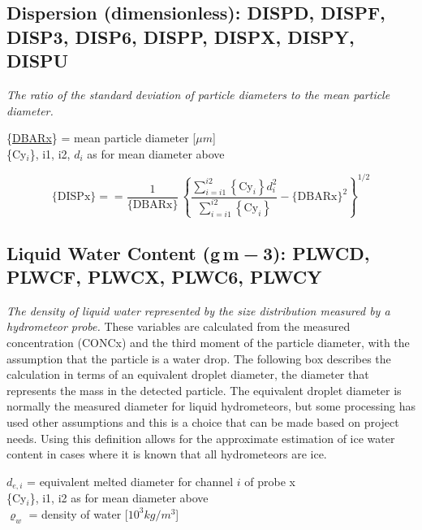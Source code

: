 \documentclass[
]{book}
\begin{document}
\hypertarget{dispersion}{%
\subsection*{Dispersion (dimensionless): DISPD, DISPF, DISP3, DISP6, DISPP, DISPX, DISPY, DISPU}\label{dispersion}}

\emph{The ratio of the standard deviation of particle diameters to the mean particle diameter.}

\{\protect\hyperlink{mean-diameter}{DBARx}\} = mean particle diameter {[}\(\mu m\){]}\\
\{Cy\(_{i}\)\}, i1, i2, \(d_{i}\) as for mean diameter above

\begin{equation}
\mathrm{\{DISPx\}}==\frac{1}{\{\mathrm{DBARx}\}}\,\left\{ \frac{{\textstyle \sum_{i=i1}^{i2}}{\displaystyle {\displaystyle \left\{ \mathrm{Cy}_{i}\right\} d_{i}^{2}}}}{\sum_{i=i1}^{i2}\left\{ \mathrm{Cy}_{i}\right\} }-\{\mathrm{DBARx}\}^{2}\right\} ^{1/2}
\label{eq:DISPbox}
\end{equation}

\hypertarget{PSD-LWC}{%
\subsection*{\texorpdfstring{Liquid Water Content (g m{ − 3}): PLWCD, PLWCF, PLWCX, PLWC6, PLWCY}{Liquid Water Content (g m − 3): PLWCD, PLWCF, PLWCX, PLWC6, PLWCY}}\label{PSD-LWC}}

\emph{The density of liquid water represented by the size distribution measured by a hydrometeor probe.} These variables are calculated from the measured concentration (CONCx) and the third moment of the particle diameter, with the assumption that the particle is a water drop. The following box describes the calculation in terms of an equivalent droplet diameter, the diameter that represents the mass in the detected particle. The equivalent droplet diameter is normally the measured diameter for liquid hydrometeors, but some processing has used other assumptions and this is a choice that can be made based on project needs. Using this definition allows for the approximate estimation of ice water content in cases where it is known that all hydrometeors are ice.

\(d_{e,i}\) = equivalent melted diameter for channel \(i\) of probe x\\
\{Cy\(_{i}\)\}, i1, i2 as for mean diameter above\\
\(\varrho_{w}\)
= density of water {[}\(10^{3}kg/m^{3}\){]}
\end{document}
